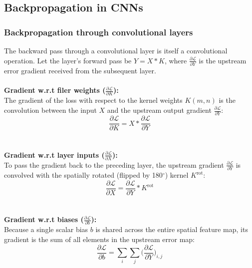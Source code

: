 \documentclass[11pt]{article}
\begin{document}
\subsection{Backpropagation in CNNs}
\subsubsection{Backpropagation through convolutional layers}
The backward pass through a convolutional layer is itself a convolutional operation. Let the layer's forward pass be $Y=X\ast K$, where $\frac{\partial \mathcal{L}}{\partial Y}$ is the upstream error gradient received from the subsequent layer.
\\\\
\textbf{Gradient w.r.t filer weights ($\frac{\partial \mathcal{L}}{\partial K}$):}\\
The gradient of the loss with respect to the kernel weights $K(m,n)$ is the convolution between the input $X$ and the upstream output gradient $\frac{\partial \mathcal{L}}{\partial Y}$:
$$
\frac{\partial \mathcal{L}}{\partial K}=X\ast\frac{\partial \mathcal{L}}{\partial Y}
$$
\\\\
\textbf{Gradient w.r.t layer inputs ($\frac{\partial \mathcal{L}}{\partial X}$):}\\
To pass the gradient back to the preceding layer, the upstream gradient $\frac{\partial \mathcal{L}}{\partial Y}$ is convolved with the spatially rotated (flipped by 180$^{\circ}$) kernel $K^{\text{rot}}$:
$$
\frac{\partial \mathcal{L}}{\partial X}=\frac{\partial \mathcal{L}}{\partial Y}\ast K^{\text{rot}}
$$
\\\\
\textbf{Gradient w.r.t biases ($\frac{\partial \mathcal{L}}{\partial b}$):}\\
Because a single scalar bias $b$ is shared across the entire spatial feature map, its gradient is the sum of all elements in the upstream error map:
$$
\frac{\partial \mathcal{L}}{\partial b}=\sum_i\sum_j\Big(\frac{\partial \mathcal{L}}{\partial Y}\Big)_{i,j}
$$
\end{document}
